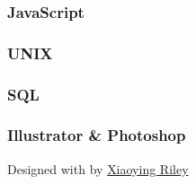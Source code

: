 \documentclass[
  english,
]{article}
\begin{document}
\hypertarget{javascript}{%
\subsubsection{JavaScript}\label{javascript}}

\hypertarget{unix}{%
\subsubsection{UNIX}\label{unix}}

\hypertarget{sql}{%
\subsubsection{SQL}\label{sql}}

\hypertarget{illustrator-photoshop}{%
\subsubsection{Illustrator \& Photoshop}\label{illustrator-photoshop}}

{Designed with \emph{} by \href{http://themes.3rdwavemedia.com}{Xiaoying
Riley}}
\end{document}
